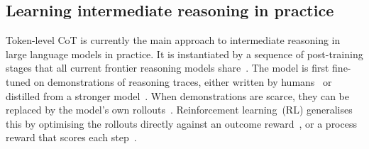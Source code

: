 \subsection{Learning intermediate reasoning in practice}
\label{sec:bg_reasoning_practice}

Token-level CoT is currently the main approach to intermediate reasoning in large language models in practice.
It is instantiated by a sequence of post-training stages that all current frontier reasoning models share~\citep{zhangSurveyReinforcementLearning2025}.
The model is first fine-tuned on demonstrations of reasoning traces, either written by humans~\citep{ouyangTrainingLanguageModels2022} or distilled from a stronger model~\citep{guhaOpenThoughtsDataRecipes2025,deepseek-aiDeepSeekR1IncentivizingReasoning2025}.
When demonstrations are scarce, they can be replaced by the model's own rollouts~\citep{zelikmanSTaRBootstrapping2022,yuanScalingRelationshipLearning2023,gulcehreReinforcedSelfTrainingReST2023,singhBeyondHumanData2024,hosseiniVSTaRTrainingVerifiers2024}.
Reinforcement learning~(RL) generalises this by optimising the rollouts directly against an outcome reward~\citep{shaoDeepSeekMathPushingLimits2024,deepseek-aiDeepSeekR1IncentivizingReasoning2025,openaiLearningReasonLLMs2024,lambertTulu3Pushing2025,yangQwen3TechnicalReport2025,teamKimiK3Open2026}, or a process reward that scores each step~\citep{uesatoSolvingMathWord2022,lightmanLetsVerifyStep2023,luoImproveMathematicalReasoning2024}.

